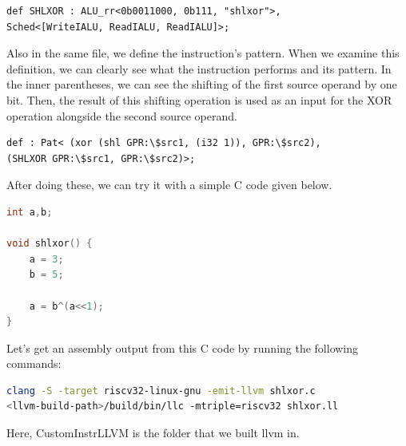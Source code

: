 \begin{lstlisting}
def SHLXOR : ALU_rr<0b0011000, 0b111, "shlxor">,
Sched<[WriteIALU, ReadIALU, ReadIALU]>;
\end{lstlisting}

Also in the same file, we define the instruction’s pattern. When we examine this definition, we can clearly see what the instruction performs and its pattern. In the inner parentheses, we can see the shifting of the first source operand by one bit. Then, the result of this shifting operation is used as an input for the XOR operation alongside the second source operand.

\begin{lstlisting}
def : Pat< (xor (shl GPR:\$src1, (i32 1)), GPR:\$src2),
(SHLXOR GPR:\$src1, GPR:\$src2)>;
\end{lstlisting}

After doing these, we can try it with a simple C code given below. 

\begin{lstlisting}[language=C++]
int a,b;

void shlxor() {
	a = 3;
	b = 5;
		
	a = b^(a<<1);
}
\end{lstlisting}

Let’s get an assembly output from this C code by running the following commands:

\begin{lstlisting}[language=Bash]
clang -S -target riscv32-linux-gnu -emit-llvm shlxor.c
<llvm-build-path>/build/bin/llc -mtriple=riscv32 shlxor.ll
\end{lstlisting}


Here, CustomInstrLLVM is the folder that we built llvm in.

